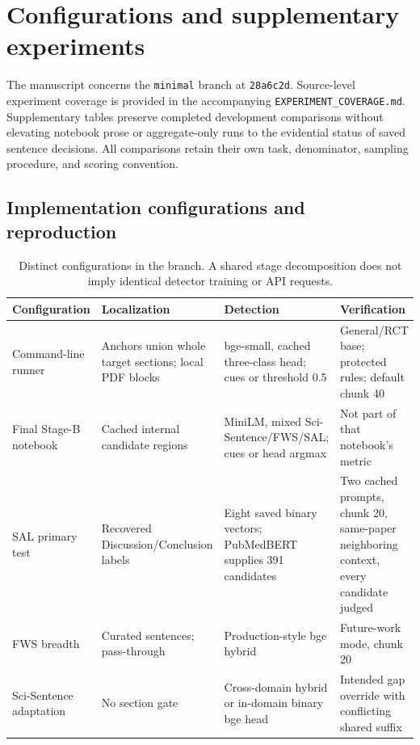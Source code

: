 \section{Configurations and supplementary experiments}
\label{A:configuration}

The manuscript concerns the \texttt{minimal} branch at \texttt{28a6c2d}. Source-level experiment
coverage is provided in the accompanying \texttt{EXPERIMENT\_COVERAGE.md}. Supplementary tables
preserve completed development comparisons without elevating notebook prose or aggregate-only
runs to the evidential status of saved sentence decisions. All comparisons retain their own
task, denominator, sampling procedure, and scoring convention.

\subsection{Implementation configurations and reproduction}
\label{A:implementation}

\begin{table}[H]
\centering\small
\caption{Distinct configurations in the branch. A shared stage decomposition does not imply
identical detector training or API requests.}
\label{T:configurations}
\begin{tabularx}{\linewidth}{@{}>{\raggedright\arraybackslash}p{2.6cm}YYY@{}}
\toprule
Configuration & Localization & Detection & Verification \\
\midrule
Command-line runner & Anchors union whole target sections; local PDF blocks & bge-small, cached three-class head; cues or threshold 0.5 & General/RCT base; protected rules; default chunk 40 \\
Final Stage-B notebook & Cached internal candidate regions & MiniLM, mixed Sci-Sentence/FWS/SAL; cues or head argmax & Not part of that notebook's metric \\
SAL primary test & Recovered Discussion/Conclusion labels & Eight saved binary vectors; PubMedBERT supplies 391 candidates & Two cached prompts, chunk 20, same-paper neighboring context, every candidate judged \\
FWS breadth & Curated sentences; pass-through & Production-style bge hybrid & Future-work mode, chunk 20 \\
Sci-Sentence adaptation & No section gate & Cross-domain hybrid or in-domain binary bge head & Intended gap override with conflicting shared suffix \\
\bottomrule
\end{tabularx}
\end{table}

